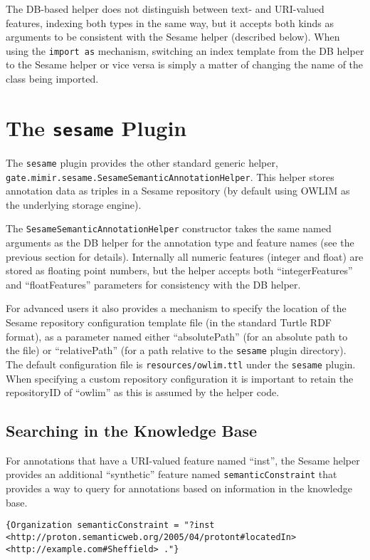 The DB-based helper does not distinguish between text- and URI-valued features,
indexing both types in the same way, but it accepts both kinds as arguments
to be consistent with the Sesame helper (described below).  When using the
{\tt import as} mechanism, switching an index template from the DB helper to
the Sesame helper or vice versa is simply a matter of changing the name of the
class being imported.

\section{The {\tt sesame} Plugin}\label{sec:plugins:sesame}

The {\tt sesame} plugin provides the other standard generic helper,
\lstinline!gate.mimir.sesame.SesameSemanticAnnotationHelper!.  This helper
stores annotation data as triples in a Sesame repository (by default using
OWLIM as the underlying storage engine).

The \lstinline!SesameSemanticAnnotationHelper! constructor takes the same named
arguments as the DB helper for the annotation type and feature names (see the
previous section for details).  Internally all numeric features (integer and
float) are stored as floating point numbers, but the helper accepts both
``integerFeatures'' and ``floatFeatures'' parameters for consistency with the
DB helper.

For advanced users it also provides a mechanism to specify the location of the
Sesame repository configuration template file (in the standard Turtle RDF
format), as a parameter named either ``absolutePath'' (for an absolute path
to the file) or ``relativePath'' (for a path relative to the {\tt sesame}
plugin directory).  The default configuration file is {\tt resources/owlim.ttl}
under the {\tt sesame} plugin.  When specifying a custom repository
configuration it is important to retain the repositoryID of ``owlim'' as this
is assumed by the helper code.

\subsection{Searching in the Knowledge Base}

For annotations that have a URI-valued feature named ``inst'', the Sesame
helper provides an additional ``synthetic'' feature named
{\tt semanticConstraint} that provides a way to query for annotations based on
information in the knowledge base.
\begin{lstlisting}[breaklines]
{Organization semanticConstraint = "?inst <http://proton.semanticweb.org/2005/04/protont#locatedIn> <http://example.com#Sheffield> ."}
\end{lstlisting}


